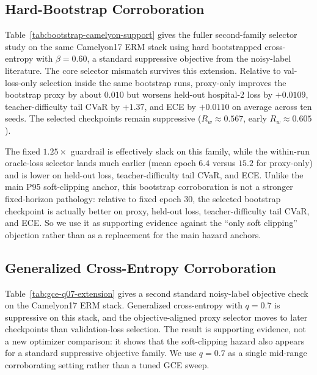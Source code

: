 \subsection{Hard-Bootstrap Corroboration}
Table~\ref{tab:bootstrap-camelyon-support} gives the fuller second-family selector study on the same Camelyon17 ERM stack using hard bootstrapped cross-entropy with $\beta=0.60$, a standard suppressive objective from the noisy-label literature.
The core selector mismatch survives this extension.
Relative to val-loss-only selection inside the same bootstrap runs, proxy-only improves the bootstrap proxy by about $0.010$ but worsens held-out hospital-2 loss by $+0.0109$, teacher-difficulty tail CVaR by $+1.37$, and ECE by $+0.0110$ on average across ten seeds.
The selected checkpoints remain suppressive ($R_w \approx 0.567$, early $R_w \approx 0.605$).

The fixed $1.25\times$ guardrail is effectively slack on this family, while the within-run oracle-loss selector lands much earlier (mean epoch $6.4$ versus $15.2$ for proxy-only) and is lower on held-out loss, teacher-difficulty tail CVaR, and ECE.
Unlike the main P95 soft-clipping anchor, this bootstrap corroboration is not a stronger fixed-horizon pathology: relative to fixed epoch 30, the selected bootstrap checkpoint is actually better on proxy, held-out loss, teacher-difficulty tail CVaR, and ECE.
So we use it as supporting evidence against the ``only soft clipping'' objection rather than as a replacement for the main hazard anchors.

\begin{table}[h]
  \centering
  \small
  \resizebox{0.92\columnwidth}{!}{}
  \caption{
    Hard-bootstrap selector extension on Camelyon17 ERM ($\beta=0.60$, ten seeds).
    Deltas are measured relative to the baseline-selected checkpoint.
    Proxy-only and val-loss-only are selectors on the same bootstrap runs; oracle loss is the best held-out-loss epoch within those same runs.
    The selector-level hazard is still the proxy-only versus safer-selector gap:
    proxy-only is slightly better on its own bootstrap proxy but materially worse on held-out loss, teacher-difficulty tail CVaR, and ECE.
    The fixed $1.25\times$ guardrail is included for completeness and is effectively slack on this family.
  }
  \label{tab:bootstrap-camelyon-support}
\end{table}

\subsection{Generalized Cross-Entropy Corroboration}
Table~\ref{tab:gce-q07-extension} gives a second standard noisy-label objective check on the Camelyon17 ERM stack.
Generalized cross-entropy with $q=0.7$ is suppressive on this stack, and the objective-aligned proxy selector moves to later checkpoints than validation-loss selection.
The result is supporting evidence, not a new optimizer comparison: it shows that the soft-clipping hazard also appears for a standard suppressive objective family.
We use $q=0.7$ as a single mid-range corroborating setting rather than a tuned GCE sweep.

